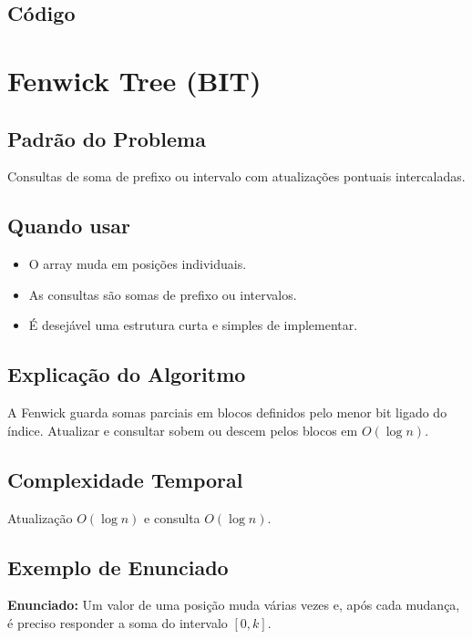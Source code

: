 \subsection{Código}

\section{Fenwick Tree (BIT)}

\subsection{Padrão do Problema}
Consultas de soma de prefixo ou intervalo com atualizações pontuais intercaladas.

\subsection{Quando usar}
\begin{itemize}[nosep]
  \item O array muda em posições individuais.
  \item As consultas são somas de prefixo ou intervalos.
  \item É desejável uma estrutura curta e simples de implementar.
\end{itemize}

\subsection{Explicação do Algoritmo}
A Fenwick guarda somas parciais em blocos definidos pelo menor bit ligado do índice. Atualizar e consultar sobem ou descem pelos blocos em $O(\log n)$.

\subsection{Complexidade Temporal}
Atualização $O(\log n)$ e consulta $O(\log n)$.

\subsection{Exemplo de Enunciado}
\begin{exemplodiabox}
\textbf{Enunciado:} Um valor de uma posição muda várias vezes e, após cada mudança, é preciso responder a soma do intervalo $[0,k]$.
\end{exemplodiabox}

